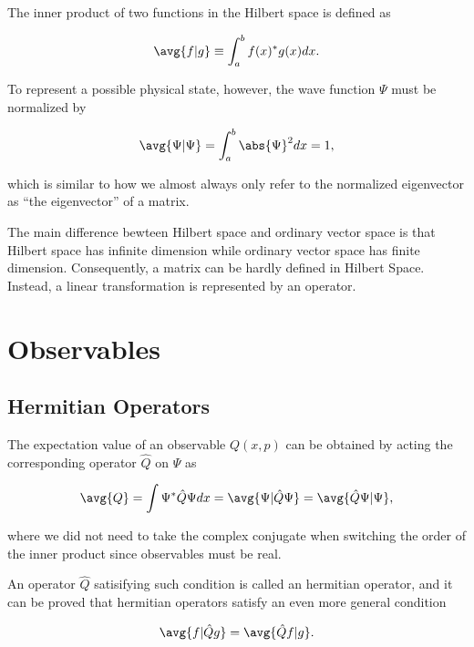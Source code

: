 \documentclass[a4paper,12pt]{report}
\begin{document}
The inner product of two functions in the Hilbert space is defined as 

\begin{equation}
  \avg{f | g} \equiv \int_{a}^{b} f(x)^*g(x)dx.  
\end{equation}

To represent a possible physical state, however, the wave function \(\Psi \) must be normalized by

\begin{equation}
  \avg{\Psi | \Psi } = \int_{a}^{b} \abs{\Psi }^2 dx = 1, 
\end{equation}

which is similar to how we almost always only refer to the normalized eigenvector as ``the eigenvector'' of a matrix.

The main difference bewteen Hilbert space and ordinary vector space is that Hilbert space has infinite dimension while ordinary vector space has finite dimension. Consequently, a matrix can be hardly defined in Hilbert Space. Instead, a linear transformation is represented by an operator. 

\section{Observables}

\subsection{Hermitian Operators}

The expectation value of an observable \(Q(x,p)\) can be obtained by acting the corresponding operator \(\hat{Q} \) on \(\Psi \) as 

\begin{equation}
  \avg{Q} = \int \Psi ^* \hat{Q} \Psi dx = \avg{\Psi | \hat{Q} \Psi } = \avg{\hat{Q} \Psi | \Psi }, \label{avgq} 
\end{equation}

where we did not need to take the complex conjugate when switching the order of the inner product since observables must be real. 

An operator \(\hat{Q} \) satisifying such condition is called an hermitian operator, and it can be proved that hermitian operators satisfy an even more general condition 

\begin{equation}
  \avg{f | \hat{Q} g} = \avg{\hat{Q} f | g}.  
\end{equation}
\end{document}
